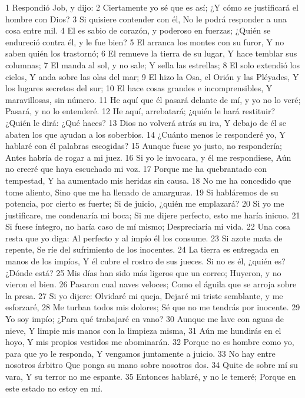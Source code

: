 1 Respondió Job, y dijo:
2 Ciertamente yo sé que es así;
¿Y cómo se justificará el hombre con Dios?
3 Si quisiere contender con él,
No le podrá responder a una cosa entre mil.
4 El es sabio de corazón, y poderoso en fuerzas;
¿Quién se endureció contra él, y le fue bien?
5 El arranca los montes con su furor,
Y no saben quién los trastornó;
6 El remueve la tierra de su lugar,
Y hace temblar sus columnas;
7 El manda al sol, y no sale;
Y sella las estrellas;
8 El solo extendió los cielos,
Y anda sobre las olas del mar;
9 El hizo la Osa, el Orión y las Pléyades, 
Y los lugares secretos del sur; 
10 El hace cosas grandes e incomprensibles,
Y maravillosas, sin número.
11 He aquí que él pasará delante de mí, y yo no lo veré;
Pasará, y no lo entenderé.
12 He aquí, arrebatará; ¿quién le hará restituir?
¿Quién le dirá: ¿Qué haces?
13 Dios no volverá atrás su ira,
Y debajo de él se abaten los que ayudan a los soberbios.
14 ¿Cuánto menos le responderé yo,
Y hablaré con él palabras escogidas?
15 Aunque fuese yo justo, no respondería;
Antes habría de rogar a mi juez.
16 Si yo le invocara, y él me respondiese,
Aún no creeré que haya escuchado mi voz.
17 Porque me ha quebrantado con tempestad,
Y ha aumentado mis heridas sin causa. 
18 No me ha concedido que tome aliento,
Sino que me ha llenado de amarguras.
19 Si habláremos de su potencia, por cierto es fuerte;
Si de juicio, ¿quién me emplazará?
20 Si yo me justificare, me condenaría mi boca;
Si me dijere perfecto, esto me haría inicuo.
21 Si fuese íntegro, no haría caso de mí mismo;
Despreciaría mi vida.
22 Una cosa resta que yo diga: 
Al perfecto y al impío él los consume.
23 Si azote mata de repente,
Se ríe del sufrimiento de los inocentes.
24 La tierra es entregada en manos de los impíos,
Y él cubre el rostro de sus jueces.
Si no es él, ¿quién es? ¿Dónde está?
25 Mis días han sido más ligeros que un correo;
Huyeron, y no vieron el bien.
26 Pasaron cual naves veloces;
Como el águila que se arroja sobre la presa.
27 Si yo dijere: Olvidaré mi queja,
Dejaré mi triste semblante, y me esforzaré, 
28 Me turban todos mis dolores;
Sé que no me tendrás por inocente.
29 Yo soy impío;
¿Para qué trabajaré en vano?
30 Aunque me lave con aguas de nieve,
Y limpie mis manos con la limpieza misma,
31 Aún me hundirás en el hoyo,
Y mis propios vestidos me abominarán.
32 Porque no es hombre como yo, para que yo le responda,
Y vengamos juntamente a juicio.
33 No hay entre nosotros árbitro
Que ponga su mano sobre nosotros dos. 
34 Quite de sobre mí su vara,
Y su terror no me espante.
35 Entonces hablaré, y no le temeré;
Porque en este estado no estoy en mí.

